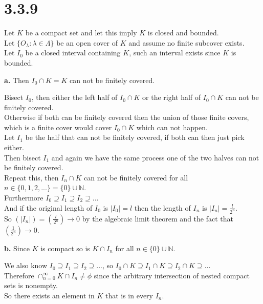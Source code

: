 \documentclass{article}
\begin{document}
\newpage
\section*{3.3.9}
\begin{center}
    Let $K$ be a compact set and let this imply $K$ is closed and bounded.
    \\Let $\{O_{\lambda} :\lambda\in\Lambda\}$ be an open cover of $K$ and assume no finite subcover exists.
    \\Let $I_0$ be a closed interval containing $K$, such an interval exists since $K$ is bounded.
\end{center}

{\Large \textbf{a.}} Then $I_0\cap K = K$ can not be finitely covered.
\begin{center}
    \doublespacing
    Bisect $I_0$, then either the left half of $I_0\cap K$ or the right half of $I_0\cap K$ can not be finitely covered.
    \\Otherwise if both can be finitely covered then the union of those finite covers, which is a finite cover would cover $I_0\cap K$ which can not happen.
    \\Let $I_1$ be the half that can not be finitely covered, if both can then just pick either.
    \\Then bisect $I_1$ and again we have the same process one of the two halves can not be finitely covered.
    \\Repeat this, then $I_n\cap K$ can not be finitely covered for all $n\in\{0, 1, 2, ...\} = \{0\}\cup\mathbb{N}$.
    \\Furthermore $I_0\supseteq I_1\supseteq I_2\supseteq ...$
    \\And if the original length of $I_0$ is $|I_0| = l$ then the length of $I_n$ is $|I_n| =\frac{l}{2^n}$.
    \\So $(|I_n|) = (\frac{l}{2^n})\rightarrow 0$ by the algebraic limit theorem and the fact that $(\frac{1}{2^n})\rightarrow 0$.
\end{center}

{\Large \textbf{b.}} Since $K$ is compact so is $K\cap I_n$ for all $n\in\{0\}\cup\mathbb{N}$.
\begin{center}
    \doublespacing
    We also know $I_0\supseteq I_1\supseteq I_2\supseteq ...$, so $I_0\cap K\supseteq I_1\cap K\supseteq I_2\cap K\supseteq ...$
    \\Therefore $\cap _{n=0}^{\infty} K\cap I_n\neq\phi$ since the arbitrary intersection of nested compact sets is nonempty.
    \\So there exists an element in $K$ that is in every $I_n$.
\end{center}
\end{document}
